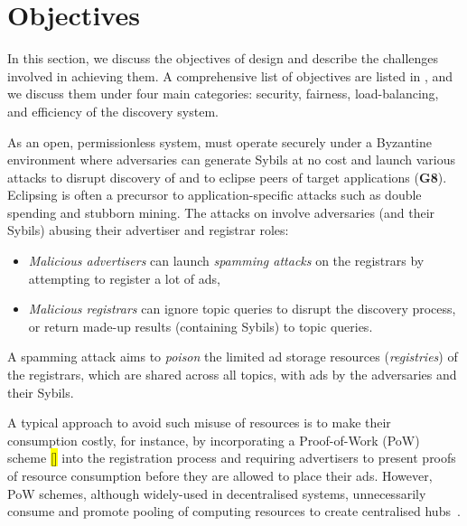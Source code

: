 \section{Objectives}
\label{sec:objectives}

In this section, we discuss the objectives of \sysname design and describe the challenges involved in achieving them. A comprehensive list of objectives are listed in , and we discuss them under four main categories: security, fairness, load-balancing, and efficiency of the discovery system.

 As an open, permissionless system, \sysname must operate securely under a Byzantine environment where adversaries can generate Sybils at no cost and launch various attacks to disrupt discovery of and to eclipse peers of target applications (\textbf{G8}). Eclipsing is often a precursor to application-specific attacks such as double spending and stubborn mining. The attacks on \sysname involve adversaries (and their Sybils) abusing their advertiser and registrar roles:



\begin{itemize}
 \item \textit{Malicious advertisers} can launch \textit{spamming attacks} on the registrars by attempting to register a lot of ads,
 \item \textit{Malicious registrars} can ignore topic queries to disrupt the discovery process, or return made-up results (\eg containing Sybils) to topic queries.
\end{itemize}

A spamming attack aims to \textit{poison} the limited ad storage resources (\ie \textit{registries}) of the registrars, which are shared across all topics, with ads by the adversaries and their Sybils.


A typical approach to avoid such misuse of resources is to make their consumption costly, for instance, by incorporating a Proof-of-Work (PoW) scheme \hl{[]} into the registration process and requiring advertisers to present proofs of resource consumption before they are allowed to place their ads. However, PoW schemes, although widely-used in decentralised systems, unnecessarily consume and promote pooling of computing resources to create centralised hubs~\cite{gervais2014bitcoin}.

